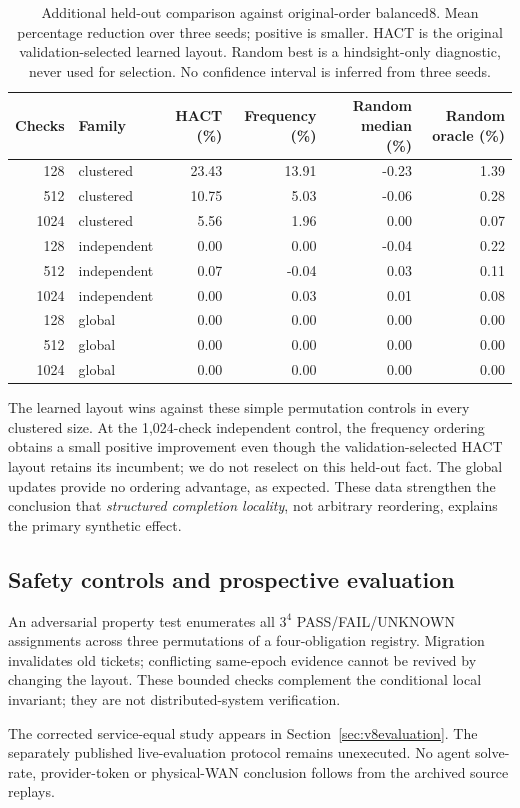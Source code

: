 \begin{table}[t]\centering\small
\caption{Additional held-out comparison against original-order balanced8. Mean percentage reduction over three seeds; positive is smaller. HACT is the original validation-selected learned layout. Random best is a hindsight-only diagnostic, never used for selection. No confidence interval is inferred from three seeds.}\label{tab:v7strong}
\begin{tabular}{@{}rlrrrr@{}}\toprule
Checks & Family & HACT (\%) & Frequency (\%) & Random median (\%) & Random oracle (\%)\\\midrule
128 & clustered & 23.43 & 13.91 & -0.23 & 1.39\\
512 & clustered & 10.75 & 5.03 & -0.06 & 0.28\\
1024 & clustered & 5.56 & 1.96 & 0.00 & 0.07\\
128 & independent & 0.00 & 0.00 & -0.04 & 0.22\\
512 & independent & 0.07 & -0.04 & 0.03 & 0.11\\
1024 & independent & 0.00 & 0.03 & 0.01 & 0.08\\
128 & global & 0.00 & 0.00 & 0.00 & 0.00\\
512 & global & 0.00 & 0.00 & 0.00 & 0.00\\
1024 & global & 0.00 & 0.00 & 0.00 & 0.00\\\bottomrule
\end{tabular}
\end{table}
The learned layout wins against these simple permutation controls in every clustered size. At the 1,024-check independent control, the frequency ordering obtains a small positive improvement even though the validation-selected HACT layout retains its incumbent; we do not reselect on this held-out fact. The global updates provide no ordering advantage, as expected. These data strengthen the conclusion that \emph{structured completion locality}, not arbitrary reordering, explains the primary synthetic effect.

\subsection{Safety controls and prospective evaluation}
An adversarial property test enumerates all $3^4$ PASS/FAIL/UNKNOWN
assignments across three permutations of a four-obligation registry. Migration
invalidates old tickets; conflicting same-epoch evidence cannot be revived by
changing the layout. These bounded checks complement the conditional local
invariant; they are not distributed-system verification.

The corrected service-equal study appears in Section~\ref{sec:v8evaluation}.
The separately published live-evaluation protocol remains unexecuted. No
agent solve-rate, provider-token or physical-WAN conclusion follows from the
archived source replays.

